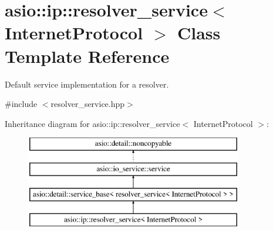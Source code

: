 \hypertarget{classasio_1_1ip_1_1resolver__service}{}\section{asio\+:\+:ip\+:\+:resolver\+\_\+service$<$ Internet\+Protocol $>$ Class Template Reference}
\label{classasio_1_1ip_1_1resolver__service}


Default service implementation for a resolver.  




{\ttfamily \#include $<$resolver\+\_\+service.\+hpp$>$}

Inheritance diagram for asio\+:\+:ip\+:\+:resolver\+\_\+service$<$ Internet\+Protocol $>$\+:\begin{figure}[H]
\begin{center}
\leavevmode
\includegraphics[height=4.000000cm]{classasio_1_1ip_1_1resolver__service}
\end{center}
\end{figure}
